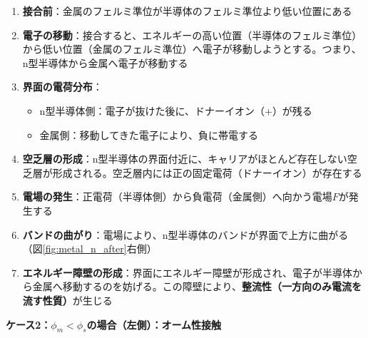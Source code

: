 \begin{enumerate}
\item \textbf{接合前}：金属のフェルミ準位が半導体のフェルミ準位より低い位置にある

\item \textbf{電子の移動}：接合すると、エネルギーの高い位置（半導体のフェルミ準位）から低い位置（金属のフェルミ準位）へ電子が移動しようとする。つまり、n型半導体から金属へ電子が移動する

\item \textbf{界面の電荷分布}：
\begin{itemize}
\item n型半導体側：電子が抜けた後に、ドナーイオン（$+$）が残る
\item 金属側：移動してきた電子により、負に帯電する
\end{itemize}

\item \textbf{空乏層の形成}：n型半導体の界面付近に、キャリアがほとんど存在しない空乏層が形成される。空乏層内には正の固定電荷（ドナーイオン）が存在する

\item \textbf{電場の発生}：正電荷（半導体側）から負電荷（金属側）へ向かう電場$F$が発生する

\item \textbf{バンドの曲がり}：電場により、n型半導体のバンドが界面で上方に曲がる（図\ref{fig:metal_n_after}右側）

\item \textbf{エネルギー障壁の形成}：界面にエネルギー障壁が形成され、電子が半導体から金属へ移動するのを妨げる。この障壁により、\textbf{整流性（一方向のみ電流を流す性質）}が生じる
\end{enumerate}

\textbf{ケース2：$\phi_m < \phi_s$の場合（左側）：オーム性接触}

